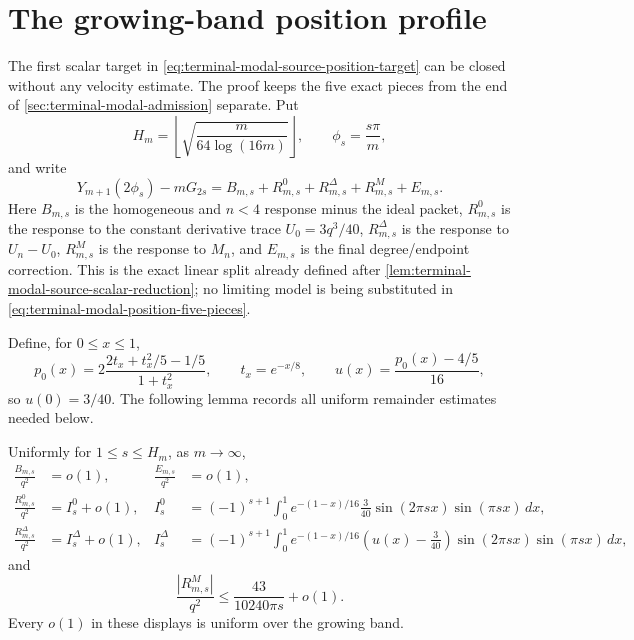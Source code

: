 \section{The growing-band position profile}
\label{sec:terminal-modal-position-profile}

The first scalar target in
\eqref{eq:terminal-modal-source-position-target} can be closed without any
velocity estimate.  The proof keeps the five exact pieces from the end of
\cref{sec:terminal-modal-admission} separate.  Put
\begin{equation}
 H_m=\left\lfloor\sqrt{\frac{m}{64\log(16m)}}\right\rfloor,
 \qquad \phi_s=\frac{s\pi}{m},
 \label{eq:terminal-modal-bandwidth}
\end{equation}
and write
\begin{equation}
 Y_{m+1}(2\phi_s)-mG_{2s}
 =B_{m,s}+R^0_{m,s}+R^\Delta_{m,s}+R^M_{m,s}+E_{m,s}.
 \label{eq:terminal-modal-position-five-pieces}
\end{equation}
Here $B_{m,s}$ is the homogeneous and $n<4$ response minus the ideal packet,
$R^0_{m,s}$ is the response to the constant derivative trace
$U_0=3q^3/40$, $R^\Delta_{m,s}$ is the response to $U_n-U_0$,
$R^M_{m,s}$ is the response to $M_n$, and $E_{m,s}$ is the final
degree/endpoint correction.  This is the exact linear split already defined
after \cref{lem:terminal-modal-source-scalar-reduction}; no limiting model is
being substituted in \eqref{eq:terminal-modal-position-five-pieces}.

Define, for $0\le x\le1$,
\begin{equation}
 p_0(x)=2\frac{2t_x+t_x^2/5-1/5}{1+t_x^2},
 \qquad
 t_x=e^{-x/8},
 \qquad
 u(x)=\frac{p_0(x)-4/5}{16},
 \label{eq:terminal-modal-position-limit-profile}
\end{equation}
so $u(0)=3/40$.  The following lemma records all uniform remainder estimates
needed below.

\begin{lemma}
\label{lem:terminal-modal-position-source-limits}
Uniformly for $1\le s\le H_m$, as $m\to\infty$,
\begin{align}
 \frac{B_{m,s}}{q^2}&=o(1),
 &\frac{E_{m,s}}{q^2}&=o(1),
 \label{eq:terminal-modal-position-small-pieces}\\
 \frac{R^0_{m,s}}{q^2}
 &=I^0_s+o(1),
 &
 I^0_s&=(-1)^{s+1}\int_0^1 e^{-(1-x)/16}
 \frac3{40}\sin(2\pi sx)\sin(\pi sx)\,dx,
 \label{eq:terminal-modal-position-constant-limit}\\
 \frac{R^\Delta_{m,s}}{q^2}
 &=I^\Delta_s+o(1),
 &
 I^\Delta_s&=(-1)^{s+1}\int_0^1 e^{-(1-x)/16}
 \left(u(x)-\frac3{40}\right)
 \sin(2\pi sx)\sin(\pi sx)\,dx,
 \label{eq:terminal-modal-position-varying-limit}
\end{align}
and
\begin{equation}
 \frac{|R^M_{m,s}|}{q^2}
 \le \frac{43}{10240\pi s}+o(1).
 \label{eq:terminal-modal-position-mass-limit}
\end{equation}
Every $o(1)$ in these displays is uniform over the growing band.
\end{lemma}

